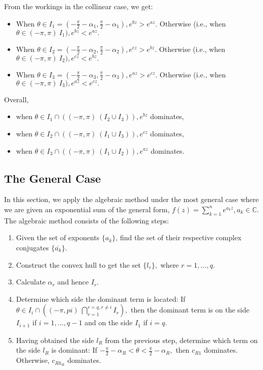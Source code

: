 \documentclass[11pt,reqno,oneside,a4paper]{article}
\begin{document}
From the workings in the collinear case, we get:
\begin{itemize}
	\item When $\theta \in I_1 = \left(-\frac{\pi}{2} - \alpha_1, \frac{\pi}{2}-\alpha_1\right), e^{bz}>e^{az}.$
	Otherwise (i.e., when $\theta \in (-\pi,\pi)\ I_1), e^{bz}<e^{az}.$
	
	\item When $\theta \in I_2 = \left(-\frac{\pi}{2} - \alpha_2, \frac{\pi}{2}-\alpha_2\right), e^{cz}>e^{bz}.$
	Otherwise (i.e., when $\theta \in (-\pi,\pi)\ I_2),  e^{cz}<e^{bz}.$
	
	\item When $\theta \in I_3 = \left(-\frac{\pi}{2} - \alpha_3, \frac{\pi}{2}-\alpha_3\right), e^{az}>e^{cz}.$
	Otherwise (i.e., when $\theta \in (-\pi,\pi)\ I_3),  e^{az}<e^{cz}.$
\end{itemize}

Overall, 
\begin{itemize}
	\item when $\theta \in I_1 \cap \left((-\pi,\pi) \ (I_2\cup I_3)\right), e^{bz}$ dominates,
	\item when $\theta \in I_2 \cap \left((-\pi,\pi) \ (I_1\cup I_3)\right), e^{cz}$ dominates,
	\item when $\theta \in I_3 \cap \left((-\pi,\pi) \ (I_1	\cup I_2)\right), e^{az}$ dominates.
\end{itemize}

\subsection{The General Case}\label{subsec:alggen}

In this section, we apply the algebraic method under the most general case where we are given an exponential sum of the general form, $f(z) = \sum_{k=1}^{n}e^{a_k z}, a_k \in \mathbb{C}$. The algebraic method consists of the following steps:

\begin{enumerate}
	\item Given the set of exponents $\{a_k\}$, find the set of their respective complex conjugates $\{\overline{a_k}\}$.
	\item Construct the convex hull to get the set $\{l_r\},$ where $r = 1,\dots,q.$
	\item Calculate $\alpha_r$ and hence $I_r$.
	\item Determine which side the dominant term is located:
	If $\theta \in I_i \cap \left((-\pi,pi)\ \bigcap_{r=1}^{r=q,r\neq i}I_r \right),$ then the dominant term is on the side $I_{i+1}$ if $i = 1,\dots,q-1$ and on the side $I_1$ if $i = q$.
	\item Having obtained the side $l_R$ from the previous step, determine which term on the side $l_R$ is dominant:
	If $-\frac{\pi}{2} - \alpha_R < \theta < \frac{\pi}{2} - \alpha_R,$  then $c_{R1}$ dominates. Otherwise, $c_{R h_R}$ dominates.
\end{enumerate}
\end{document}
